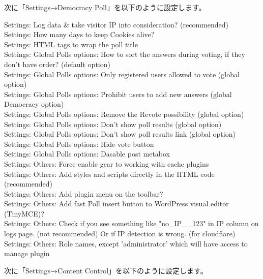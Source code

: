 \documentclass[titlepage,10pt,a4paper,uplatex]{jsbook}
\begin{document}
次に「Settings→Democracy Poll」を以下のように設定します。

\begin{description}
\item[Settings: Log data \& take visitor IP into consideration? (recommended)] 
\item[Settings: How many days to keep Cookies alive?] 
\item[Settings: HTML tags to wrap the poll title] 
\item[Settings: Global Polls options: How to sort the answers during voting, if they don't have order? (default option)] 
\item[Settings: Global Polls options: Only registered users allowed to vote (global option)] 
\item[Settings: Global Polls options: Prohibit users to add new answers (global Democracy option)] 
\item[Settings: Global Polls options: Remove the Revote possibility (global option)] 
\item[Settings: Global Polls options: Don't show poll results (global option)] 
\item[Settings: Global Polls options: Don't show poll results link (global option)] 
\item[Settings: Global Polls options: Hide vote button] 
\item[Settings: Global Polls options: Dasable post metabox] 
\item[Settings: Others: Force enable gear to working with cache plugins] 
\item[Settings: Others: Add styles and scripts directly in the HTML code (recommended)] 
\item[Settings: Others: Add plugin menu on the toolbar?] 
\item[Settings: Others: Add fast Poll insert button to WordPress visual editor (TinyMCE)?] 
\item[Settings: Others: Check if you see something like "no\_IP\_\_123" in IP column on logs page. (not recommended) Or if IP detection is wrong. (for cloudflare)] 
\item[Settings: Others: Role names, except 'administrator' which will have access to manage plugin] 
\end{description}

次に「Settings→Content Control」を以下のように設定します。

\begin{description}
\item[] 
\end{description}
\end{document}
